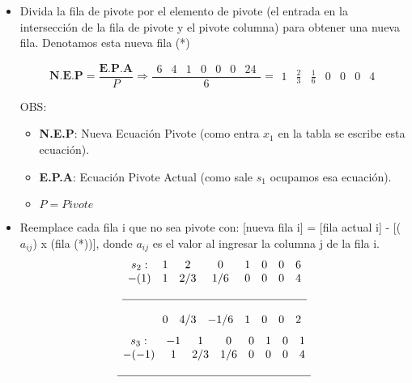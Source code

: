 \documentclass{templateNote}
\begin{document}
\begin{itemize}
    \item Divida la fila de pivote por el elemento de pivote (el entrada en la intersección de la fila de pivote y el pivote columna) para obtener una nueva fila. Denotamos esta nueva fila (*)
    \begin{center}
        \begin{equation*}
            \textbf{N.E.P} = \frac{\textbf{E.P.A}}{P} \Rightarrow \frac{\begin{array}{ccccccc} 6 & 4 & 1 & 0 & 0 & 0 & 24\end{array}}{6} = \begin{array}{ccccccc} 1 & \frac{2}{3} & \frac{1}{6} & 0 & 0 & 0 & 4 \end{array}
        \end{equation*}
    \end{center}
        OBS:
        \begin{itemize}
            \item \textbf{N.E.P}: Nueva Ecuación Pivote (como entra $x_1$ en la tabla se escribe esta ecuación).
            \item \textbf{E.P.A}: Ecuación Pivote Actual (como sale $s_1$ ocupamos esa ecuación).
            \item $P = Pivote$
        \end{itemize}
    \item Reemplace cada fila i que no sea pivote con: [nueva fila i] = [fila actual i] - [($a_{ij}$) x (fila (*))], donde  $a_{ij}$ es el valor al ingresar la columna j de la fila i.
    \begin{equation*}
        \begin{array}{cccccccc}
            s_2: & 1 & 2 & 0 & 1 & 0 & 0 & 6 \\
            -(1) & 1 & 2/3 & 1/6 & 0 & 0 & 0 & 4 \\
            \\ \hline \\
            & 0 & 4/3 & -1/6 & 1 & 0 & 0 & 2
        \end{array}
    \end{equation*}
    \vspace{0.5cm}
    \begin{equation*}
        \begin{array}{cccccccc}
            s_3: & -1 & 1 & 0 & 0 & 1 & 0 & 1 \\
            -(-1) & 1 & 2/3 & 1/6 & 0 & 0 & 0 & 4 \\
            \\ \hline \\

\end{array}
\end{equation*}
\end{itemize}
\end{document}
